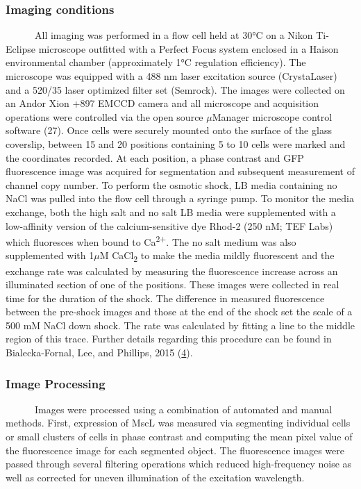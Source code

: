 \subsubsection{Imaging
conditions}\label{imaging-conditions}

~ ~ ~
~All
imaging
was
performed
in a
flow
cell
held
at
30°C
on a
Nikon
Ti-Eclipse
microscope
outfitted
with a
Perfect
Focus
system
enclosed
in a
Haison
environmental
chamber
(approximately
1°C
regulation
efficiency).
The
microscope
was
equipped
with a
488 nm
laser
excitation
source
(CrystaLaser)
and a
520/35
laser
optimized
filter
set
(Semrock).
The
images
were
collected
on an
Andor
Xion
+897
EMCCD
camera
and
all
microscope
and
acquisition
operations
were
controlled
via
the
open
source
\(\mu\)Manager
microscope
control
software
(27).
Once
cells
were
securely
mounted
onto
the
surface
of the
glass
coverslip,
between
15 and
20
positions
containing
5 to
10
cells
were
marked
and
the
coordinates
recorded.
At
each
position,
a
phase
contrast
and
GFP
fluorescence
image
was
acquired
for
segmentation
and
subsequent
measurement
of
channel
copy
number.
To
perform
the
osmotic
shock,
LB
media
containing
no
NaCl
was
pulled
into
the
flow
cell
through
a
syringe
pump.
To
monitor
the
media
exchange,
both
the
high
salt
and no
salt
LB
media
were
supplemented
with a
low-affinity
version
of the
calcium-sensitive
dye
Rhod-2
(250
nM;
TEF
Labs)
which
fluoresces
when
bound
to
Ca\textsuperscript{2+}.
The no
salt
medium
was
also
supplemented
with
1\(\mu\)M
CaCl\textsubscript{2}
to
make
the
media
mildly
fluorescent
and
the
exchange
rate
was
calculated
by
measuring
the
fluorescence
increase
across
an
illuminated
section
of one
of the
positions.
These
images
were
collected
in
real
time
for
the
duration
of the
shock.
The
difference
in
measured
fluorescence
between
the
pre-shock
images
and
those
at the
end of
the
shock
set
the
scale
of a
500 mM
NaCl
down
shock.
The
rate
was
calculated
by
fitting
a line
to the
middle
region
of
this
trace.
Further
details
regarding
this
procedure
can be
found
in
Bialecka-Fornal,
Lee,
and
Phillips,
2015
(\protect\hyperlink{ref-bialecka-fornal2015}{4}).

\subsubsection{Image
Processing}\label{image-processing}

~ ~ ~
~Images
were
processed
using
a
combination
of
automated
and
manual
methods.
First,
expression
of
MscL
was
measured
via
segmenting
individual
cells
or
small
clusters
of
cells
in
phase
contrast
and
computing
the
mean
pixel
value
of the
fluorescence
image
for
each
segmented
object.
The
fluorescence
images
were
passed
through
several
filtering
operations
which
reduced
high-frequency
noise
as
well
as
corrected
for
uneven
illumination
of the
excitation
wavelength.

